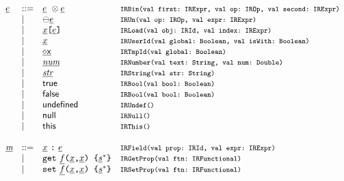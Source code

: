 \[
\begin{array}{llll}
\ir\expr &::=&
 \irexpr \ \inop \irexpr & \mtt{IRBin(val first:~IRExpr, val op:~IROp, val second:~IRExpr)}\\
 &\mid& \preop \irexpr & \mtt{IRUn(val op:~IROp, val expr:~IRExpr)}\\
 &\mid& \irid\verb+[+\ir\expr\verb+]+ & \mtt{IRLoad(val obj:~IRId, val index:~IRExpr)}\\
 &\mid& \irid& \mtt{IRUserId(val global:~Boolean, val isWith:~Boolean)}\\
 &\mid& \newvar{x}& \mtt{IRTmpId(val global:~Boolean)}\\
 &\mid& \ir\num & \mtt{IRNumber(val text:~String, val num:~Double)}\\
 &\mid& \ir\str & \mtt{IRString(val str:~String)}\\
 &\mid& {\sf true} & \mtt{IRBool(val bool:~Boolean)}\\
 &\mid& {\sf false} & \mtt{IRBool(val bool:~Boolean)}\\
 &\mid& {\sf undefined} & \mtt{IRUndef()}\\
 &\mid& {\sf null} & \mtt{IRNull()}\\
 &\mid& {\sf this} & \mtt{IRThis()}\\\\

\ir\member &::=& \irid \ \verb+:+ \ \irexpr & \mtt{IRField(val prop:~IRId, val expr:~IRExpr)}\\
 &\mid& {\tt get}\ \ir{f} \verb+(+\irid\verb+,+\irid\verb+) {+ \ir\stmt^* \verb+}+
 &\mtt{IRGetProp(val ftn:~IRFunctional)}\\
 &\mid& {\tt set}\ \ir{f} \verb+(+\irid\verb+,+\irid\verb+) {+ \ir\stmt^* \verb+}+
 &\mtt{IRSetProp(val ftn:~IRFunctional)}\\

\end{array}
\]


